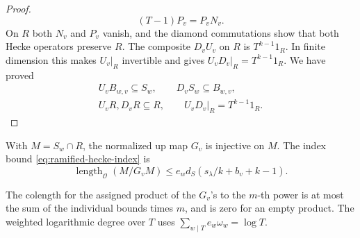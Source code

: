 \begin{proof}
\[
  (T-1)P_v=P_vN_v.
\]
 On \(R\) both \(N_v\) and \(P_v\)
vanish, and the diamond commutations show that both
Hecke operators preserve \(R\). The composite \(D_vU_v\)
on \(R\) is \(T^{k-1}1_R\). In finite dimension this
makes \(U_v|_R\) invertible and gives \(U_vD_v|_R=T^{k-1}1_R\).
We have proved
\begin{equation}\label{eq:ramified-hecke-input}
 \begin{gathered}
 U_v B_{w,v}\subseteq S_w,\qquad D_v S_w\subseteq B_{w,v},\\
 U_v R,D_v R\subseteq R,\qquad U_v D_v|_R=T^{k-1}1_R .
 \end{gathered}
\end{equation}

\end{proof}

\begin{proposition}\label{prop:ramified-selected-hecke-colength}
With \(M=S_w\cap R\), the normalized up map \(G_v\) is injective on \(M\). The index bound \eqref{eq:ramified-hecke-index} is
\[
 \operatorname{length}_{\mathcal O}(M/G_vM)\le e_wd_S(s_\lambda/k+b_v+k-1).
\]

The colength for the assigned product of the \(G_v\)'s to the
\(m\)-th power is at most the sum of the individual bounds times
\(m\), and is zero for an empty product. The weighted logarithmic
degree over \(T\) uses \(\sum_{w\mid T} e_w\omega_w=\log T\).
\end{proposition}

